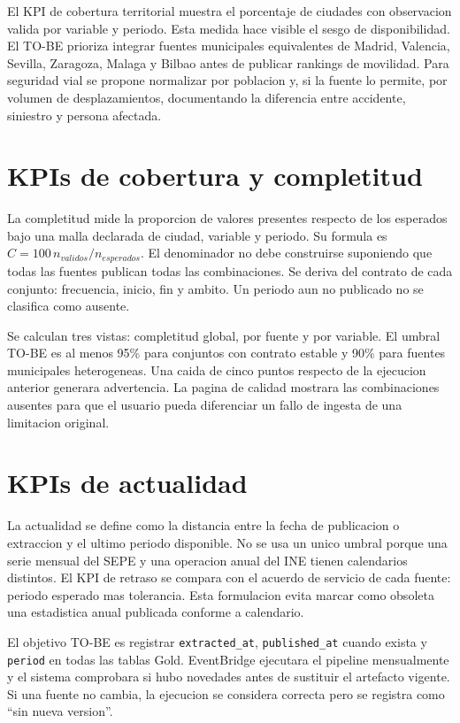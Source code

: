 El KPI de cobertura territorial muestra el porcentaje de ciudades con observacion valida por variable y periodo. Esta medida hace visible el sesgo de disponibilidad. El TO-BE prioriza integrar fuentes municipales equivalentes de Madrid, Valencia, Sevilla, Zaragoza, Malaga y Bilbao antes de publicar rankings de movilidad. Para seguridad vial se propone normalizar por poblacion y, si la fuente lo permite, por volumen de desplazamientos, documentando la diferencia entre accidente, siniestro y persona afectada.

\section{KPIs de cobertura y completitud}

La completitud mide la proporcion de valores presentes respecto de los esperados bajo una malla declarada de ciudad, variable y periodo. Su formula es $C=100\,n_{validos}/n_{esperados}$. El denominador no debe construirse suponiendo que todas las fuentes publican todas las combinaciones. Se deriva del contrato de cada conjunto: frecuencia, inicio, fin y ambito. Un periodo aun no publicado no se clasifica como ausente.

Se calculan tres vistas: completitud global, por fuente y por variable. El umbral TO-BE es al menos 95\% para conjuntos con contrato estable y 90\% para fuentes municipales heterogeneas. Una caida de cinco puntos respecto de la ejecucion anterior generara advertencia. La pagina de calidad mostrara las combinaciones ausentes para que el usuario pueda diferenciar un fallo de ingesta de una limitacion original.

\section{KPIs de actualidad}

La actualidad se define como la distancia entre la fecha de publicacion o extraccion y el ultimo periodo disponible. No se usa un unico umbral porque una serie mensual del SEPE y una operacion anual del INE tienen calendarios distintos. El KPI de retraso se compara con el acuerdo de servicio de cada fuente: periodo esperado mas tolerancia. Esta formulacion evita marcar como obsoleta una estadistica anual publicada conforme a calendario.

El objetivo TO-BE es registrar \texttt{extracted\_at}, \texttt{published\_at} cuando exista y \texttt{period} en todas las tablas Gold. EventBridge ejecutara el pipeline mensualmente y el sistema comprobara si hubo novedades antes de sustituir el artefacto vigente. Si una fuente no cambia, la ejecucion se considera correcta pero se registra como ``sin nueva version''.

